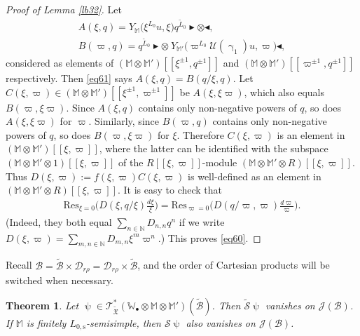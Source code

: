 \documentclass[12pt,a4paper,notitlepage]{article}
\theoremstyle{definition}
\theoremstyle{plain}
\newtheorem{thm}[df]{Theorem}
\newcommand{\fk}{\mathfrak}
\newcommand{\mc}{\mathcal}
\newcommand{\wtd}{\widetilde}
\newcommand{\Res}{\mathrm{Res}}
\newcommand{\scr}{\mathscr}
\newcommand{\blt}{\bullet}
\newcommand{\Wbb}{\mathbb W}
\newcommand{\Mbb}{\mathbb M}
\newcommand{\Nbb}{\mathbb N}
\newcommand{\btl}{\blacktriangleleft}
\newcommand{\btr}{\blacktriangleright}
\newcommand{\Lss}{{L_{0,\mathrm{s}}}}
\numberwithin{equation}{section}
\begin{document}
\begin{proof}[Proof of Lemma \ref{lb32}]
	Let 
	\begin{gather*}
	A(\xi,q)=Y_{\Mbb}\big(\xi^{L_0}u,\xi\big)q^{\wtd L_0}\btr\otimes\btl,\\
	B(\varpi,q)=q^{\wtd L_0}\btr\otimes~Y_{\Mbb'}\big(\varpi^{L_0}\mc U(\upgamma_1)u,\varpi\big)\btl,
	\end{gather*}
	considered as elements of $(\Mbb\otimes\Mbb')[[\xi^{\pm1},q^{\pm 1}]]$ and $(\Mbb\otimes\Mbb')[[\varpi^{\pm1},q^{\pm 1}]]$ respectively. Then \eqref{eq61} says $A(\xi,q)=B(q/\xi,q)$. Let $C(\xi,\varpi)\in(\Mbb\otimes\Mbb')[[\xi^{\pm 1},\varpi^{\pm1}]]$  be $A(\xi,\xi\varpi)$, which also equals $B(\varpi,\xi\varpi)$. Since $A(\xi,q)$ contains only non-negative  powers of $q$, so does $A(\xi,\xi\varpi)$ for $\varpi$.   Similarly, since $B(\varpi,q)$ contains only non-negative powers of $q$, so does $B(\varpi,\xi\varpi)$ for $\xi$. Therefore $C(\xi,\varpi)$ is an element in  $(\Mbb\otimes\Mbb')[[\xi,\varpi]]$, where the latter  can be identified with the subspace $(\Mbb\otimes\Mbb'\otimes 1)[[\xi,\varpi]]$ of the $R[[\xi,\varpi]]$-module $(\Mbb\otimes\Mbb'\otimes R)[[\xi,\varpi]]$. Thus $D(\xi,\varpi):=f(\xi,\varpi)C(\xi,\varpi)$ is well-defined as an element in $(\Mbb\otimes\Mbb'\otimes R)[[\xi,\varpi]]$. It is easy to check that
	\begin{align*}
	\Res_{\xi=0}\bigg(D(\xi,q/\xi)\frac{d\xi}{\xi}\bigg)=\Res_{\varpi=0}\bigg(D(q/\varpi,\varpi)\frac{d\varpi}{\varpi}\bigg).
	\end{align*}
	(Indeed, they both equal $\sum_{n\in\Nbb}D_{n,n}q^n$ if we write $D(\xi,\varpi)=\sum_{m,n\in\Nbb}D_{m,n}\xi^m\varpi^n$.) This proves \eqref{eq60}.
\end{proof}




Recall $\mc B=\wtd{\mc B}\times\mc D_{r\rho}=\mc D_{r\rho}\times\wtd{\mc B}$, and the order of Cartesian products will be switched when necessary.

\begin{thm}\label{lb34}
	Let $\uppsi\in\scr T_{\wtd{\fk X}}^*(\Wbb_\blt\otimes\Mbb\otimes\Mbb')(\wtd{\mc B})$. Then $\wtd{\mc S}\uppsi$ vanishes on $\scr J(\mc B)$. If $\Mbb$ is  finitely $\Lss$-semisimple, then  $\mc S\uppsi$ also vanishes on $\scr J(\mc B)$.
\end{thm}
\end{document}
